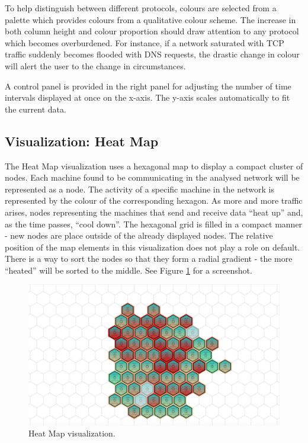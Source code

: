 To help distinguish between different protocols, colours are selected from a palette which provides
colours from a qualitative colour scheme. The increase in both column height and colour proportion
should draw attention to any protocol which becomes overburdened. For instance, if a network
saturated with TCP traffic suddenly becomes flooded with DNS requests, the drastic change in colour
will alert the user to the change in circumstances. 

A control panel is provided in the right panel for adjusting the number of time intervals displayed
at once on the x-axis. The y-axis scales automatically to fit the current data.

\subsection{Visualization: Heat Map}
%
The Heat Map visualization uses a hexagonal map to display a compact cluster of nodes.
Each machine found to be communicating in the analysed network will be represented as a node.
The activity of a specific machine in the network is represented by the colour of the 
corresponding hexagon. As more and more traffic arises, nodes representing the machines that
send and receive data ``heat up'' and, as the time passes, ``cool down''.
The hexagonal grid is filled in a compact manner - new nodes are place outside of 
the already displayed nodes. The relative position of the map elements in this visualization
does not play a role on default. There is a way to sort the nodes so that they form a radial 
gradient - the more ``heated'' will be sorted to the middle. See Figure \ref{fig:heatmap}
for a screenshot.

\begin{figure}[htb]
   \centering
   \includegraphics[width=\linewidth]{materials/heat-map.jpg}
   \caption[Heat Map]{\label{fig:heatmap}
         Heat Map visualization.}
\end{figure}

